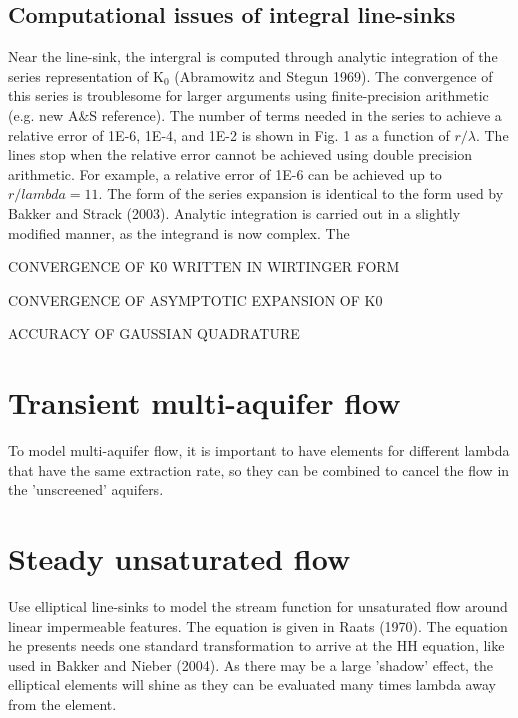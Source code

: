 \documentclass{elsart}
\begin{document}
\subsection{Computational issues of integral line-sinks}
Near the line-sink, the intergral is computed through analytic integration of the series representation of K$_0$ (Abramowitz and Stegun 1969). The convergence of this series is troublesome for larger arguments using finite-precision arithmetic (e.g. new A\&S reference). The number of terms needed in the series to achieve a relative error of 1E-6, 1E-4, and 1E-2 is shown in Fig. 1 as a function of $r/\lambda$. The lines stop when the relative error cannot be achieved using double precision arithmetic. For example, a relative error of 1E-6 can be achieved up to $r/lambda=11$. The form of the series expansion is identical to the form used by Bakker and Strack (2003). Analytic integration is carried out in a slightly modified manner, as the integrand is now complex. The 

CONVERGENCE OF K0 WRITTEN IN WIRTINGER FORM

CONVERGENCE OF ASYMPTOTIC EXPANSION OF K0

ACCURACY OF GAUSSIAN QUADRATURE

\section{Transient multi-aquifer flow}
To model multi-aquifer flow, it is important to have elements for different lambda that have the same extraction rate, so they can be combined to cancel the flow in the 'unscreened' aquifers. 

\section{Steady unsaturated flow}
Use elliptical line-sinks to model the stream function for unsaturated flow around linear impermeable features. The equation is given in Raats (1970). The equation he presents needs one standard transformation to arrive at the HH equation, like used in Bakker and Nieber (2004). As there may be a large 'shadow' effect, the elliptical elements will shine as they can be evaluated many times lambda away from the element.
\end{document}
